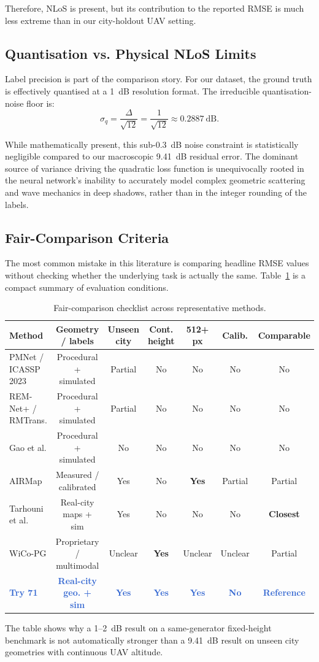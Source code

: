 \documentclass[11pt,a4paper]{article}
\newcommand{\better}[1]{\textcolor{good}{\textbf{#1}}}
\newcommand{\ours}[1]{\textcolor{highlight}{\textbf{#1}}}
\begin{document}
Therefore, NLoS is present, but its contribution to the reported RMSE is
much less extreme than in our city-holdout UAV setting.

\subsection{Quantisation vs. Physical NLoS Limits}

Label precision is part of the comparison story. For our dataset, the ground truth is effectively quantised at a 1~dB resolution format. The irreducible quantisation-noise floor is:
\[
    \sigma_q = \frac{\Delta}{\sqrt{12}} = \frac{1}{\sqrt{12}} \approx 0.2887~\mathrm{dB}.
\]

While mathematically present, this sub-0.3~dB noise constraint is statistically negligible compared to our macroscopic 9.41~dB residual error. The dominant source of variance driving the quadratic loss function is unequivocally rooted in the neural network's inability to accurately model complex geometric scattering and wave mechanics in deep shadows, rather than in the integer rounding of the labels.

\subsection{Fair-Comparison Criteria}

The most common mistake in this literature is comparing headline RMSE values
without checking whether the underlying task is actually the same. Table~\ref{tab:fairness} is a compact summary of evaluation conditions.

\begin{table}[h!]
\centering
\caption{Fair-comparison checklist across representative methods.}
\label{tab:fairness}
\footnotesize
\begin{tabularx}{\textwidth}{Xcccccc}
\toprule
\textbf{Method} & \textbf{Geometry / labels} & \textbf{Unseen city} & \textbf{Cont. height}
& \textbf{512+ px} & \textbf{Calib.} & \textbf{Comparable} \\
\midrule
PMNet / ICASSP 2023 & Procedural + simulated & Partial & No & No & No & No \\
REM-Net+ / RMTrans. & Procedural + simulated & Partial & No & No & No & No \\
Gao et al. & Procedural + simulated & No & No & No & No & No \\
AIRMap & Measured / calibrated & Yes & No & \better{Yes} & Partial & Partial \\
Tarhouni et al. & Real-city maps + sim & Yes & No & No & No & \better{Closest} \\
WiCo-PG & Proprietary / multimodal & Unclear & \better{Yes} & Unclear & Unclear & Partial \\
\ours{Try 71} & \ours{Real-city geo. + sim} & \ours{Yes} & \ours{Yes} & \ours{Yes} & \ours{No} & \ours{Reference} \\
\bottomrule
\end{tabularx}
\end{table}
\normalsize
The table shows why a 1--2~dB result on a same-generator fixed-height benchmark
is not automatically stronger than a 9.41~dB result on unseen city geometries with
continuous UAV altitude. 
\end{document}
